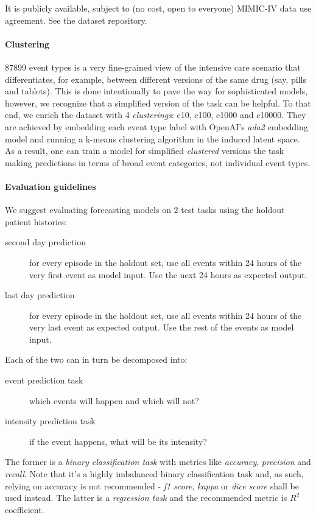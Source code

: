It is publicly available, subject to (no cost, open to everyone) MIMIC-IV data use agreement.
See the dataset repository.

\paragraph{Clustering}

87899 event types is a very fine-grained view of the intensive care scenario that differentiates, for example, between different versions of the same drug (say, pills and tablets).
This is done intentionally to pave the way for sophisticated models, however, we recognize that a simplified version of the task can be helpful.
To that end, we enrich the dataset with 4 \emph{clusterings}: c10, c100, c1000 and c10000.
They are achieved by embedding each event type label with OpenAI's \emph{ada2} embedding model and running a k-means clustering algorithm in the induced latent space.
As a result, one can train a model for simplified \emph{clustered} versions the task making predictions in terms of broad event categories, not individual event types.

\paragraph{Evaluation guidelines}

We suggest evaluating forecasting models on 2 test tasks using the holdout patient histories:
\begin{description}
    \item[second day prediction] for every episode in the holdout set, use all events within 24 hours of the very first event as model input. Use the next 24 hours as expected output.
    \item[last day prediction] for every episode in the holdout set, use all events within 24 hours of the very last event as expected output. Use the rest of the events as model input. 
\end{description}

Each of the two can in turn be decomposed into:
\begin{description}
    \item[event prediction task] which events will happen and which will not?
    \item[intensity prediction task] if the event happens, what will be its intensity?
\end{description}

The former is a \emph{binary classification task} with metrics like \emph{accuracy}, \emph{precision} and \emph{recall}.
Note that it's a highly imbalanced binary classification task and, as such, relying on accuracy is not recommended - \emph{f1 score}, \emph{kappa} or \emph{dice score} shall be used instead.
The latter is a \emph{regression task} and the recommended metric is $R^2$ coefficient.

